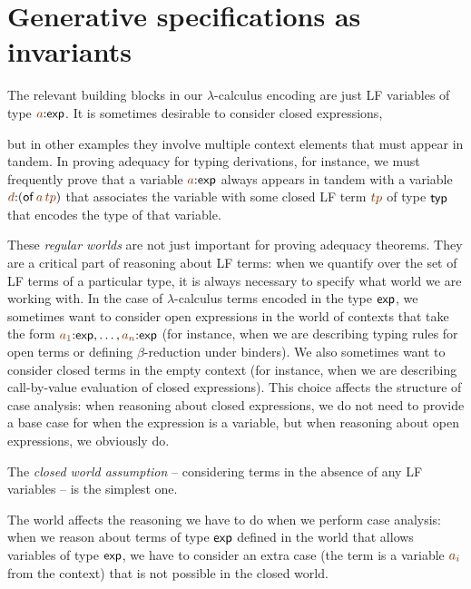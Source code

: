 \chapter{Generative specifications as invariants}
\label{chapter-genspec}

The relevant building blocks in our $\lambda$-calculus encoding are
just LF variables of type $\lf{a}{:}{\sf exp}$. It is sometimes
desirable to consider closed expressions, 



but in other examples they
involve multiple context elements that must appear in tandem. In
proving adequacy for typing derivations, for instance, we must
frequently prove that a variable $\lf{a}{:}{\sf exp}$ always appears
in tandem with a variable $\lf{d}{:}({\sf of}\,\lf{a}\,\lf{tp})$ that
associates the variable with some closed LF term $\lf{tp}$ of type
${\sf typ}$ that encodes the type of that variable.

These {\it regular worlds} are not just important for proving adequacy
theorems. They are a critical part of reasoning about LF terms: when
we quantify over the set of LF terms of a particular type, it is
always necessary to specify what world we are working with. In the
case of $\lambda$-calculus terms encoded in the type ${\sf exp}$, we
sometimes want to consider open expressions in the world of contexts
that take the form $\lf{a_1}{:}{\sf exp},\ldots,\lf{a_n}{:}{\sf exp}$
(for instance, when we are describing typing rules for open terms or
defining $\beta$-reduction under binders). We also sometimes want to
consider closed terms in the empty context (for instance, when we are
describing call-by-value evaluation of closed expressions).  This
choice affects the structure of case analysis: when reasoning
about closed expressions, we do not need to provide a base case for
when the expression is a variable, but when reasoning about open
expressions, we obviously do.

The {\it closed world assumption} -- considering terms in the absence
of any LF variables -- is the simplest one. 


The world affects the reasoning we have to do when we perform case
analysis: when we reason about terms of type ${\sf exp}$ defined in
the world that allows variables of type ${\sf exp}$, we have to
consider an extra case (the term is a variable $\lf{a_i}$ from the
context) that is not possible in the closed world. 
